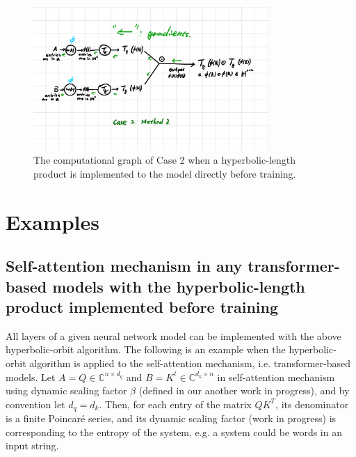 \documentclass{article}
\theoremstyle{plain}
\theoremstyle{plain} %
\theoremstyle{definition}  %
\theoremstyle{remark}  %
\theoremstyle{plain}
\begin{document}

\begin{figure}[H]
\centering
\includegraphics[width=0.8\textwidth]{5.png}
\caption{The computational graph of Case 2 when a hyperbolic-length product is implemented to the model directly before training.}
\end{figure}






\section{Examples}
\subsection{Self-attention mechanism in any transformer-based models with the hyperbolic-length product implemented before training}
All layers of a given neural network model can be implemented with the above hyperbolic-orbit algorithm. The following is an example when the hyperbolic-orbit algorithm is applied to the self-attention mechanism, i.e. transformer-based models.
Let $A=Q\in \mathbb{C}^{n\times d_q}$ and $B=K^t\in \mathbb{C}^{d_k\times n}$ in self-attention mechanism\cite{vaswani2017attention} using dynamic scaling factor $\beta$ (defined in our another work in progress), and by convention let $d_q=d_k$. Then, for each entry of the matrix $QK^T$, its denominator is a finite Poincar\'{e} series\cite{chuang2022hausdorff}, and its dynamic scaling factor (work in progress) is corresponding to the entropy of the system, e.g. a system could be words in an input string.



\end{document}

